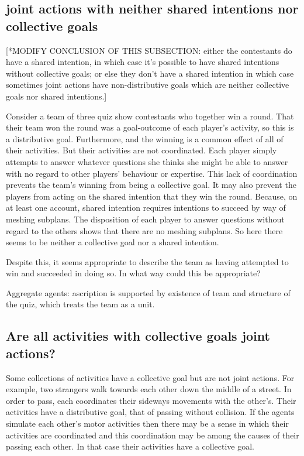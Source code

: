 \documentclass[12pt,a4paper]{extarticle}
\begin{document}
\subsection{joint actions with neither shared intentions nor collective goals}

[*MODIFY CONCLUSION OF THIS SUBSECTION: either the contestants do have a shared intention, in which case it's possible to have shared intentions without collective goals; or else they don't have a shared intention in which case sometimes joint actions have non-distributive goals which are neither collective goals nor shared intentions.]

Consider a team of three quiz show contestants who together win a round.
That their team won the round was a goal-outcome of each player's activity, so this is a distributive goal.  
Furthermore,  and the winning is a common effect of all of their activities.
But their activities are not coordinated.  Each player simply attempts to answer whatever questions she thinks she might be able to answer with no regard to other players' behaviour or expertise.
This lack of coordination prevents the team's winning from being a collective goal.
It may also prevent the players from acting on the shared intention that they win the round.  Because, on at least one account, shared intention requires intentions to succeed by way of meshing subplans.  The disposition of each player to answer questions without regard to the others shows that there are no meshing subplans.
So here there seems to be neither a collective goal nor a shared intention.

Despite this, it seems appropriate to describe the team as having attempted to win and succeeded in doing so.  In what way could this be appropriate?

Aggregate agents: ascription is supported by existence of team and structure of the quiz, which treats the team as a unit.

 


\subsection{Are all activities with collective goals joint actions?}
Some collections of activities have a collective goal but are not joint actions.  For example, two strangers walk towards each other down the middle of a street.  In order to pass, each coordinates their sideways movements with the other's.  Their activities have a distributive goal, that of passing without collision.  If the agents simulate each other's motor activities then there may be a sense in which their activities are coordinated and this coordination may be among the causes of their passing each other.  In that case their activities have a collective goal.
\end{document}

